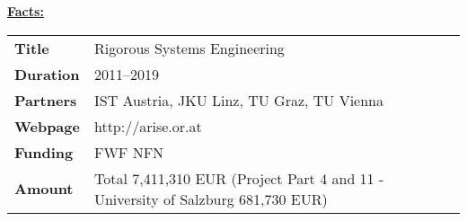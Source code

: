 \textcolor{\workinggroupboxtextcolor}{
	\textbf{\underline{Facts:}}
	\newline
	\newline
	\begin{tabular}{l p{}}
		\textbf{Title} & Rigorous Systems Engineering \\
		\textbf{Duration} & 2011--2019 \\
		\textbf{Partners} & IST Austria, JKU Linz, TU Graz, TU Vienna \\
        \textbf{Webpage} & http://arise.or.at\\
		\textbf{Funding} & FWF NFN \\
		\textbf{Amount} & Total 7,411,310 EUR (Project Part 4 and 11 - University of Salzburg 681,730 EUR) 
	\end{tabular}
}